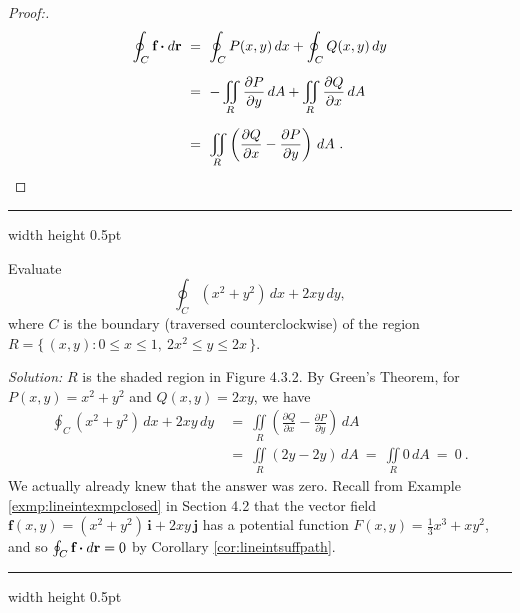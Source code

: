 \begin{proofbar}
\begin{proof}[Proof:]
 \begin{align*}
  \oint_{C} \textbf{f} \bm{\cdot} d\textbf{r} ~&=~ \oint_C P(x,y)\,dx + \oint_C Q(x,y)\,dy\\[6pt]
   &=~ -\iint\limits_{R} \frac{\partial P}{\partial y}\,dA + \iint\limits_{R} \frac{\partial Q}{\partial x}\,dA\\[6pt]
   &=~ \iint\limits_{R} \left( \frac{\partial Q}{\partial x} - \frac{\partial P}{\partial y} \right)\,dA ~.
 \end{align*}
\end{proof}\end{proofbar}
\hrule width \textwidth height 0.5pt
\begin{exmp}\label{exmp:greenexmp}
  Evaluate \[\oint_{C} (x^2 + y^2 )\,dx + 2xy\,dy,\] where $C$ is the boundary (traversed counterclockwise) of the region
  $R = \lbrace\,(x,y): 0 \le x \le 1,~2x^2 \le y \le 2x \,\rbrace$.

 \piccaption[]{}
 \par\noindent \emph{Solution:} $R$ is the shaded region in Figure 4.3.2. By Green's Theorem, for
 $P(x,y)=x^2 + y^2$ and $Q(x,y)=2xy$, we have
 \begin{align*}
  \oint_C (x^2 + y^2 )\,dx + 2xy\,dy ~&=~ \iint\limits_{R} \left( \frac{\partial Q}{\partial x} -
   \frac{\partial P}{\partial y} \right)\,dA\\
   &=~ \iint\limits_{R} (2y - 2y)\,dA
   ~=~ \iint\limits_{R} 0\,dA ~=~ 0 ~.
 \end{align*}
 We actually already knew that the answer was zero. Recall from Example
 \ref{exmp:lineintexmpclosed} in Section 4.2 that the vector field
 $\mathbf{f}(x,y) = ( x^2 + y^2 )\,\mathbf{i} + 2xy\,\mathbf{j}$ has a potential function
 $F(x,y)=\frac{1}{3}x^3 + xy^2$, and so $\oint_{C} \textbf{f} \bm{\cdot} d\textbf{r} = 0$ by Corollary \ref{cor:lineintsuffpath}.
 \end{exmp}
\hrule width \textwidth height 0.5pt
\medskip

